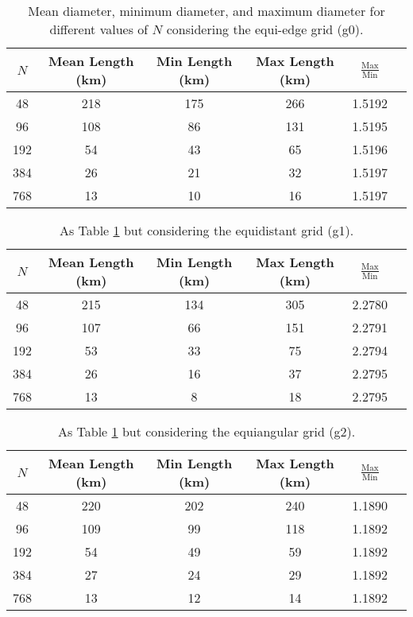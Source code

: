 \begin{table}[htbp]
    \centering
    \caption{Mean diameter, minimum diameter, and maximum diameter for different values of $N$ considering the equi-edge grid (g0).\label{g0-dx-table}}
    \begin{tabular}{cccccc}
        \toprule
        $N$ & Mean Length (km) & Min Length (km) & Max Length (km) & $\frac{\text{Max}}{\text{Min}}$ \\
        \midrule
        48 & 218 & 175 & 266 & 1.5192 \\
        96 & 108 & 86 & 131 & 1.5195 \\
        192 & 54 & 43 & 65 & 1.5196 \\
        384 & 26 & 21 & 32 & 1.5197 \\
        768 & 13 & 10 & 16 & 1.5197 \\
        \bottomrule
    \end{tabular}
\end{table}

\begin{table}[htbp]
    \centering
    \caption{As Table \ref{g0-dx-table} but considering the equidistant grid (g1). \label{g1-dx-table}}
    \begin{tabular}{cccccc}
        \toprule
        $N$ & Mean Length (km) & Min Length (km) & Max Length (km) & $\frac{\text{Max}}{\text{Min}}$ \\
        \midrule
        48 & 215 & 134 & 305 & 2.2780 \\
        96 & 107 & 66 & 151 & 2.2791 \\
        192 & 53 & 33 & 75 & 2.2794 \\
        384 & 26 & 16 & 37 & 2.2795 \\
        768 & 13 & 8 & 18 & 2.2795 \\
        \bottomrule
    \end{tabular}
\end{table}

\begin{table}[htbp]
    \centering
    \caption{As Table \ref{g0-dx-table} but considering the equiangular grid (g2). \label{g2-dx-table}}
    \begin{tabular}{cccccc}
        \toprule
        $N$ & Mean Length (km) & Min Length (km) & Max Length (km) & $\frac{\text{Max}}{\text{Min}}$ \\
        \midrule
        48 & 220 & 202 & 240 & 1.1890 \\
        96 & 109 & 99 & 118  & 1.1892 \\
        192 & 54 & 49 & 59  & 1.1892 \\
        384 & 27 & 24 & 29  & 1.1892 \\
        768 & 13 & 12 & 14  & 1.1892 \\
        \bottomrule
    \end{tabular}
\end{table}


